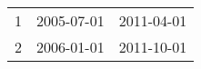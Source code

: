 % 
\begin{tabular}{ccc}
  \hline
  \hline
1 & 2005-07-01 & 2011-04-01 \\ 
  2 & 2006-01-01 & 2011-10-01 \\ 
   \hline
\end{tabular}

